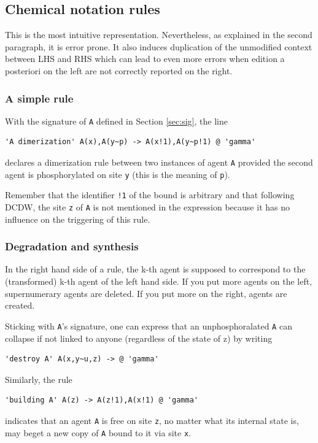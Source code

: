 \documentclass[11pt]{book}
\def\ttt#1{\texttt{#1}}
\def\via{via }
\begin{document}
\subsection{Chemical notation rules}

This is the most intuitive representation. Nevertheless, as explained in the
second paragraph, it is error prone. It also induces duplication of the unmodified context between LHS and RHS which can
lead to even more errors when edition a posteriori on the left are not
correctly reported on the right.

\subsubsection*{A simple rule}
With the signature of \ttt{A} defined in Section \ref{sec:sig}, the line
\begin{lstlisting}[language=kappa]
'A dimerization' A(x),A(y~p) -> A(x!1),A(y~p!1) @ 'gamma'
\end{lstlisting}
declares a dimerization rule between two instances of agent \ttt{A}
provided the second agent is phosphorylated on site \ttt{y} (this is the meaning of \ttt{p}).

Remember that the identifier \ttt{!1} of the bound is arbitrary and
that following DCDW, the site \ttt{z}
of \ttt{A} is not mentioned in the expression because it has no
influence on the triggering of this rule.

\subsubsection*{Degradation and synthesis}
In the right hand side of a rule, the k-th agent is supposed to
correspond to the (transformed) k-th agent of the left hand side. If
you put more agents on the left, supernumerary agents are deleted. If
you put more on the right, agents are created.

Sticking with \ttt{A}'s signature, one can
express that an unphosphoralated \ttt{A} can collapse if not linked to
anyone (regardless of the state of z) by writing
\begin{lstlisting}[language=kappa]
'destroy A' A(x,y~u,z) -> @ 'gamma'
\end{lstlisting}

Similarly, the rule
\begin{lstlisting}[language=kappa]
'building A' A(z) -> A(z!1),A(x!1) @ 'gamma'
\end{lstlisting}
indicates that an agent \ttt{A} is free on site \ttt{z}, no matter what
its internal state is, may beget a new copy of \ttt{A} bound to it
\via site \ttt{x}.
\end{document}
